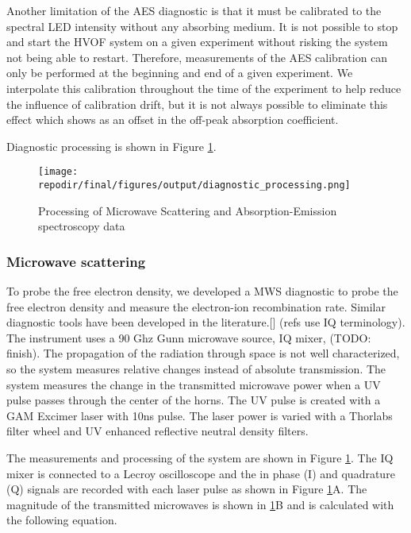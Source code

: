 Another limitation of the AES diagnostic is that it must be calibrated to the spectral LED intensity without any absorbing medium. It is not possible to stop and start the HVOF system on a given experiment without risking the system not being able to restart. Therefore, measurements of the AES calibration can only be performed at the beginning and end of a given experiment. We interpolate this calibration throughout the time of the experiment to help reduce the influence of calibration drift, but it is not always possible to eliminate this effect which shows as an offset in the off-peak absorption coefficient.

Diagnostic processing is shown in Figure \ref{fig:diagnostic_processing}.

\begin{figure}[h]
    \texttt{[image: \\repodir/final/figures/output/diagnostic\_processing.png]} 
    \caption{Processing of Microwave Scattering and Absorption-Emission spectroscopy data}
    \label{fig:diagnostic_processing}
\end{figure}


\subsubsection{Microwave scattering}



To probe the free electron density, we developed a MWS diagnostic to probe the free electron density and measure the electron-ion recombination rate. Similar diagnostic tools have been developed in the literature.[] (refs use IQ terminology). The instrument uses a 90 Ghz Gunn microwave source, IQ mixer, (TODO: finish). The propagation of the radiation through space is not well characterized, so the system measures relative changes instead of absolute transmission. The system measures the change in the transmitted microwave power when a UV pulse passes through the center of the horns. The UV pulse is created with a GAM Excimer laser with 10ns pulse. The laser power is varied with a Thorlabs filter wheel and UV enhanced reflective neutral density filters. 

The measurements and processing of the system are shown in Figure \ref{fig:diagnostic_processing}. The IQ mixer is connected to a Lecroy oscilloscope and the in phase (I) and quadrature (Q) signals are recorded with each laser pulse as shown in Figure \ref{fig:diagnostic_processing}A. The magnitude of the transmitted microwaves is shown in \ref{fig:diagnostic_processing}B and is calculated with the following equation. 

